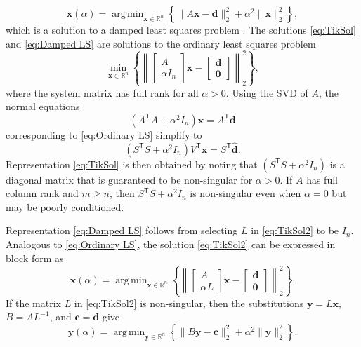 \documentclass[12pt]{article}
\newcommand{\mA}{m}	%
\newcommand{\cVec}{\mathbf{c}}	%
\newcommand{\dVec}{\mathbf{d}}	%
\newcommand{\xVec}{\mathbf{x}}	%
\newcommand{\trans}[1]{{#1}^\mathsf{T}}	%
\newcommand{\regparam}{\alpha}  %
\DeclareMathOperator*{\argmin}{arg\,min}
\newcommand{\zeroVec}{\bm{0}}	%
\newcommand{\svd}[1]{\widehat{#1}}	%
\begin{document}
\begin{equation}
\label{eq:Damped LS}
\xVec(\regparam) = \argmin_{\xVec \in \mathbb{R}^n} \left\{\|A\xVec - \dVec\|_2^2 + \regparam^2\|\xVec\|_2^2\right\},
\end{equation}
which is a solution to a damped least squares problem \cite{ABT}. The solutions \eqref{eq:TikSol} and \eqref{eq:Damped LS} are solutions to the ordinary least squares problem
\begin{equation}
\label{eq:Ordinary LS}
\min_{\xVec \in \mathbb{R}^n} \left\{\left\|
\begin{bmatrix}
A \\
\regparam I_n
\end{bmatrix}\xVec - 
\begin{bmatrix}
\dVec \\
\zeroVec
\end{bmatrix}
\right\|_2^2\right\},
\end{equation}
where the system matrix has full rank for all $\regparam > 0$. Using the SVD of $A$, the normal equations 
\[(\trans{A}A + \regparam^2 I_n)\xVec = \trans{A}\dVec\]
corresponding to \eqref{eq:Ordinary LS} simplify to
\[(\trans{S}S + \regparam^2 I_n)\trans{V}\xVec = \trans{S}\svd{\dVec}.\]
Representation \eqref{eq:TikSol} is then obtained by noting that $(\trans{S}S + \regparam^2 I_n)$ is a diagonal matrix that is guaranteed to be non-singular for $\regparam > 0$. If $A$ has full column rank and $\mA \geq n$, then $\trans{S}S + \regparam^2 I_n$ is non-singular even when $\regparam = 0$ but may be poorly conditioned. \par
Representation \eqref{eq:Damped LS} follows from selecting $L$ in \eqref{eq:TikSol2} to be $I_n$. Analogous to \eqref{eq:Ordinary LS}, the solution \eqref{eq:TikSol2} can be expressed in block form as
\begin{equation}
\xVec(\regparam) = \argmin_{\xVec \in \mathbb{R}^n} \left\{\left\| \begin{bmatrix}
A \\
\regparam L
\end{bmatrix}\xVec - \begin{bmatrix}
\dVec \\
\bm{0}
\end{bmatrix} \right\|_2^2\right\}.
\label{eq:TikSol3}
\end{equation}
If the matrix $L$ in \eqref{eq:TikSol2} is non-singular, then the substitutions $\mathbf{y} = L\xVec$, $B = A{L}^{-1}$, and $\cVec = \dVec$ give
\begin{equation}
\mathbf{y}(\regparam) = \argmin_{\mathbf{y} \in \mathbb{R}^n} \left\{\|B\mathbf{y} - \cVec\|_2^2 + \regparam^2\|\mathbf{y}\|_2^2\right\}.
\label{eq:TikSol Standard Form}
\end{equation}
\end{document}
